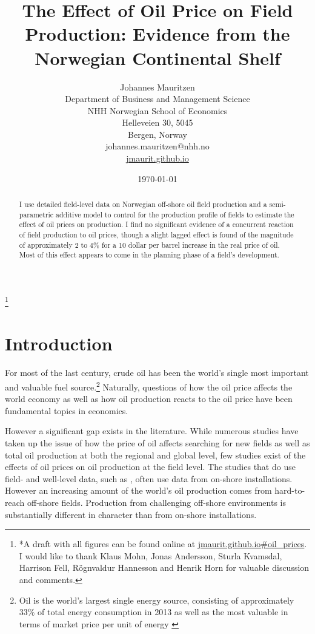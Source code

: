 \documentclass[12pt]{article}
\title{The Effect of Oil Price on Field Production: Evidence from the Norwegian Continental Shelf}
\author{Johannes Mauritzen\\
		Department of Business and Management Science\\
        NHH Norwegian School of Economics\\
        Helleveien 30, 5045\\
        Bergen, Norway\\
        johannes.mauritzen@nhh.no\\
        \url{jmaurit.github.io}\\
		}
\date{\today}
\begin{document}
	\maketitle


\begin{abstract}
I use detailed field-level data on Norwegian off-shore oil field production and a semi-parametric additive model to control for the production profile of fields to estimate the effect of oil prices on production.  I find no significant evidence of a concurrent reaction of field production to oil prices, though a slight lagged effect is found of the magnitude of approximately 2 to 4\% for a 10 dollar per barrel increase in the real price of oil.  Most of this effect appears to come in the planning phase of a field's development.
\end{abstract}

\thanks{*A draft with all figures can be found online at \url{jmaurit.github.io#oil_prices}. 
I would like to thank Klaus Mohn, Jonas Andersson, Sturla Kvamsdal, Harrison Fell, R\"ognvaldur Hannesson and Henrik Horn for valuable discussion and comments.  }

\section{Introduction}

For most of the last century, crude oil has been the world’s single most important and valuable fuel source.\footnote{Oil is the world's largest single energy source, consisting of approximately 33\% of total energy consumption in 2013 as well as the most valuable in terms of market price per unit of energy \citep{british_petroleum_statistical_2013}} Naturally, questions of how the oil price affects the world economy as well as how oil production reacts to the oil price have been fundamental topics in economics. 

However a significant gap exists in the literature.  While numerous studies have taken up the issue of how the price of oil affects searching for new fields as well as total oil production at both the regional and global level, few studies exist of the effects of oil prices on oil production at the field level.  The studies that do use field- and well-level data, such as \citet{rao_taxation_2010}, often use data from on-shore installations.  However an increasing amount of the world's oil production comes from hard-to-reach off-shore fields.  Production from challenging off-shore environments is substantially different in character than from on-shore installations.
\end{document}
